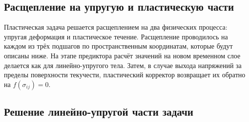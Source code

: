 \subsection{Расщепление на упругую и пластическую части}
Пластическая задача решается расщеплением на два физических процесса: упругая деформация и пластическое течение. Расщепление проводилось на каждом из трёх подшагов по пространственным координатам, которые будут описаны ниже. На этапе предиктора расчёт значений на новом временном слое делается как для линейно-упругого тела. Затем, в случае выхода напряжений за пределы поверхности текучести, пластический корректор возвращает их обратно на $f(\sigma_{ij})=0$.
\subsection{Решение линейно-упругой части задачи}

